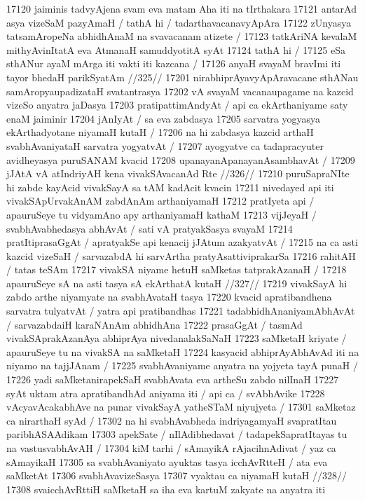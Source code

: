 17120 jaiminis tadvyAjena svam eva matam Aha iti na tIrthakara 
17121 antarAd asya vizeSaM pazyAmaH / tathA hi / tadarthavacanavyApAra 
17122 zUnyasya tatsamAropeNa abhidhAnaM na svavacanam atizete /
17123 tatkAriNA kevalaM mithyAvinItatA eva AtmanaH samuddyotitA syAt  
17124 tathA hi /
17125 	eSa sthANur ayaM mArga iti vakti iti kazcana /
17126 	anyaH svayaM bravImi iti tayor bhedaH parikSyatAm //325// 
17201 nirabhiprAyavyApAravacane sthANau samAropyaupadizataH svatantrasya
17202 vA svayaM vacanaupagame na kazcid vizeSo anyatra jaDasya 
17203 pratipattimAndyAt / api ca ekArthaniyame saty enaM jaiminir
17204 jAnIyAt / sa eva zabdasya 
17205 	sarvatra yogyasya ekArthadyotane niyamaH kutaH /
17206 na hi zabdasya kazcid arthaH svabhAvaniyataH sarvatra yogyatvAt /
17207 ayogyatve ca tadapracyuter avidheyasya puruSANAM kvacid 
17208 upanayanApanayanAsambhavAt /  
17209 	jJAtA vA atIndriyAH kena vivakSAvacanAd Rte //326// 
17210 puruSapraNIte hi zabde kayAcid vivakSayA sa tAM kadAcit kvacin
17211 nivedayed api iti vivakSApUrvakAnAM zabdAnAm arthaniyamaH
17212 pratIyeta api / apauruSeye tu vidyamAno apy arthaniyamaH kathaM  
17213 vijJeyaH / svabhAvabhedasya abhAvAt / sati vA pratyakSasya svayaM 
17214 pratItiprasaGgAt / apratyakSe api kenacij jJAtum azakyatvAt / 
17215 na ca asti kazcid vizeSaH / sarvazabdA hi sarvArtha pratyAsattiviprakarSa
17216 rahitAH / tatas teSAm
17217 	vivakSA niyame hetuH saMketas tatprakAzanaH /
17218 	apauruSeye sA na asti tasya sA ekArthatA kutaH //327//  
17219 vivakSayA hi zabdo arthe niyamyate na svabhAvataH tasya  
17220 kvacid apratibandhena sarvatra tulyatvAt / yatra api pratibandhas  
17221 tadabhidhAnaniyamAbhAvAt / sarvazabdaiH karaNAnAm abhidhAna
17222 prasaGgAt / tasmAd vivakSAprakAzanAya abhiprAya nivedanalakSaNaH 
17223 saMketaH kriyate / apauruSeye tu na vivakSA na saMketaH
17224 kasyacid abhiprAyAbhAvAd iti na niyamo na tajjJAnam /  
17225 	svabhAvaniyame anyatra na yojyeta tayA punaH /  
17226 yadi saMketanirapekSaH svabhAvata eva artheSu zabdo nilInaH
17227 syAt uktam atra apratibandhAd aniyama iti / api ca / svAbhAvike 
17228 vAcyavAcakabhAve na punar vivakSayA yatheSTaM niyujyeta / 
17301 	saMketaz ca nirarthaH syAd /
17302 na hi svabhAvabheda indriyagamyaH svapratItau paribhASAAdikam 
17303 apekSate / nIlAdibhedavat / tadapekSapratItayas tu na vastusvabhAvAH /
17304 kiM tarhi / sAmayikA rAjacihnAdivat / yaz ca sAmayikaH  
17305 sa svabhAvaniyato ayuktas tasya icchAvRtteH / ata eva saMketAt 
17306 svabhAvavizeSasya 
17307 	vyaktau ca niyamaH kutaH //328// 
17308 svaicchAvRttiH saMketaH sa iha eva kartuM zakyate na anyatra iti 
